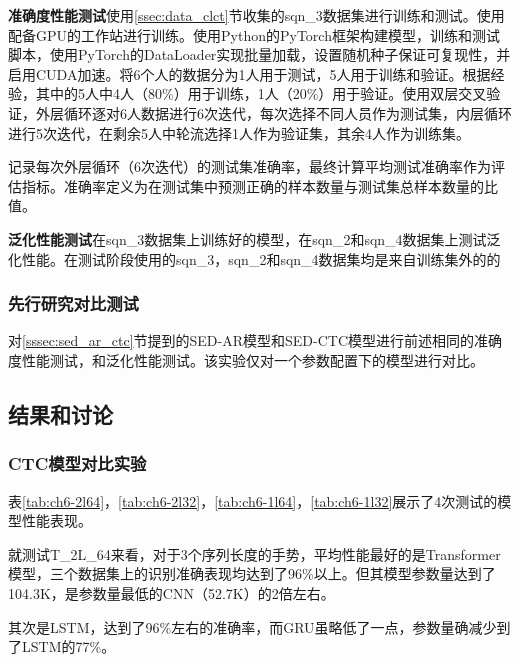 \textbf{准确度性能测试}\hspace{5pt}使用\ref{ssec:data_clct}节收集的sqn\_3数据集进行训练和测试。使用配备GPU的工作站进行训练。使用Python的PyTorch框架构建模型，训练和测试脚本，使用PyTorch的DataLoader实现批量加载，设置随机种子保证可复现性，并启用CUDA加速。将6个人的数据分为1人用于测试，5人用于训练和验证。根据经验，其中的5人中4人（80\%）用于训练，1人（20\%）用于验证。使用双层交叉验证，外层循环逐对6人数据进行6次迭代，每次选择不同人员作为测试集，内层循环进行5次迭代，在剩余5人中轮流选择1人作为验证集，其余4人作为训练集。

记录每次外层循环（6次迭代）的测试集准确率，最终计算平均测试准确率作为评估指标。准确率定义为在测试集中预测正确的样本数量与测试集总样本数量的比值。

\textbf{泛化性能测试}\hspace{5pt}在sqn\_3数据集上训练好的模型，在sqn\_2和sqn\_4数据集上测试泛化性能。在测试阶段使用的sqn\_3，sqn\_2和sqn\_4数据集均是来自训练集外的的

\subsubsection{先行研究对比测试}

对\ref{sssec:sed_ar_ctc}节提到的SED-AR模型和SED-CTC模型进行前述相同的准确度性能测试，和泛化性能测试。该实验仅对一个参数配置下的模型进行对比。

\subsection{结果和讨论}

\subsubsection{CTC模型对比实验}

表\ref{tab:ch6-2l64}，\ref{tab:ch6-2l32}，\ref{tab:ch6-1l64}，\ref{tab:ch6-1l32}展示了4次测试的模型性能表现。

就测试T\_2L\_64来看，对于3个序列长度的手势，平均性能最好的是Transformer模型，三个数据集上的识别准确表现均达到了96\%以上。但其模型参数量达到了104.3K，是参数量最低的CNN（52.7K）的2倍左右。

其次是LSTM，达到了96\%左右的准确率，而GRU虽略低了一点，参数量确减少到了LSTM的77\%。 

